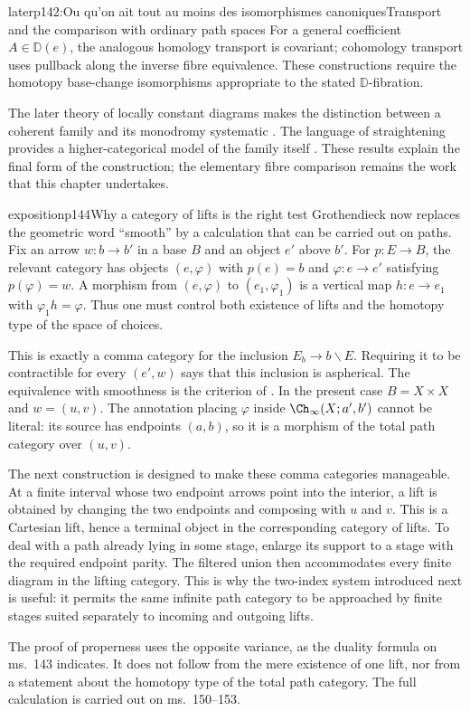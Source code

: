 \begin{dcomment}{later}{p142:Ou qu'on ait tout au moins des isomorphismes canoniques}{Transport and the comparison with ordinary path spaces}
For a general coefficient $A\in\mathbb D(e)$, the analogous homology transport is covariant; cohomology transport uses pullback along the inverse fibre equivalence. These constructions require the homotopy base-change isomorphisms appropriate to the stated $\mathbb D$-fibration.

The later theory of locally constant diagrams makes the distinction between a coherent family and its monodromy systematic \citep[Theorem~1.3 and the discussion preceding it]{Cisinski2009LocallyConstant}. The language of straightening provides a higher-categorical model of the family itself \citep[Theorem~2.2.1.2]{Lurie2009HTT}. These results explain the final form of the construction; the elementary fibre comparison remains the work that this chapter undertakes.
\end{dcomment}

\begin{dcomment}{exposition}{p144}{Why a category of lifts is the right test}
Grothendieck now replaces the geometric word ``smooth'' by a calculation that can be carried out on paths. Fix an arrow $w:b\to b'$ in a base $B$ and an object $e'$ above $b'$. For $p:E\to B$, the relevant category has objects $(e,\varphi)$ with $p(e)=b$ and $\varphi:e\to e'$ satisfying $p(\varphi)=w$. A morphism from $(e,\varphi)$ to $(e_1,\varphi_1)$ is a vertical map $h:e\to e_1$ with $\varphi_1h=\varphi$. Thus one must control both existence of lifts and the homotopy type of the space of choices.

This is exactly a comma category for the inclusion $E_b\to b\backslash E$. Requiring it to be contractible for every $(e',w)$ says that this inclusion is aspherical. The equivalence with smoothness is the criterion of \citet[Theorem~1.2]{Maltsiniotis2005Asphericite}. In the present case $B=X\times X$ and $w=(u,v)$. The annotation placing $\varphi$ inside $\Ch_\infty(X;a',b')$ cannot be literal: its source has endpoints $(a,b)$, so it is a morphism of the total path category over $(u,v)$.

The next construction is designed to make these comma categories manageable. At a finite interval whose two endpoint arrows point into the interior, a lift is obtained by changing the two endpoints and composing with $u$ and $v$. This is a Cartesian lift, hence a terminal object in the corresponding category of lifts. To deal with a path already lying in some stage, enlarge its support to a stage with the required endpoint parity. The filtered union then accommodates every finite diagram in the lifting category. This is why the two-index system introduced next is useful: it permits the same infinite path category to be approached by finite stages suited separately to incoming and outgoing lifts.

The proof of properness uses the opposite variance, as the duality formula on ms.~143 indicates. It does not follow from the mere existence of one lift, nor from a statement about the homotopy type of the total path category. The full calculation is carried out on ms.~150--153.
\end{dcomment}

